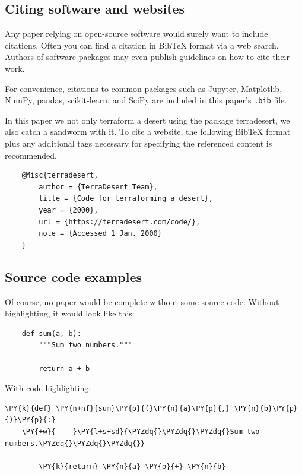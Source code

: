\subsection{Citing software and websites \label{citing-software-and-websites}}

Any paper relying on open-source software would surely want to include citations.
Often you can find a citation in BibTeX format via a web search.
Authors of software packages may even publish guidelines on how to cite their work.

For convenience, citations to common packages such as
Jupyter\cite{jupyter},
Matplotlib\cite{matplotlib},
NumPy\cite{numpy},
pandas\cite{pandas1}\cite{pandas2},
scikit-learn\cite{sklearn1}\cite{sklearn2}, and
SciPy\cite{scipy}
are included in this paper's \texttt{.bib} file.

In this paper we not only terraform a desert using the package terradesert\cite{terradesert}, we also catch a sandworm with it.
To cite a website, the following BibTeX format plus any additional tags necessary for specifying the referenced content is recommended.
\vspace{1mm}
\begin{verbatim}
    @Misc{terradesert,
        author = {TerraDesert Team},
        title = {Code for terraforming a desert},
        year = {2000},
        url = {https://terradesert.com/code/},
        note = {Accessed 1 Jan. 2000}
    }
\end{verbatim}
\vspace{1mm}

\subsection{Source code examples \label{source-code-examples}}

Of course, no paper would be complete without some source code.  Without
highlighting, it would look like this:

\begin{verbatim}
    def sum(a, b):
        """Sum two numbers."""

        return a + b
\end{verbatim}

With code-highlighting:

\vspace{1mm}
\begin{Verbatim}[commandchars=\\\{\},fontsize=\footnotesize]
    \PY{k}{def} \PY{n+nf}{sum}\PY{p}{(}\PY{n}{a}\PY{p}{,} \PY{n}{b}\PY{p}{)}\PY{p}{:}
    \PY{+w}{    }\PY{l+s+sd}{\PYZdq{}\PYZdq{}\PYZdq{}Sum two numbers.\PYZdq{}\PYZdq{}\PYZdq{}}

        \PY{k}{return} \PY{n}{a} \PY{o}{+} \PY{n}{b}
\end{Verbatim}
\vspace{1mm}

